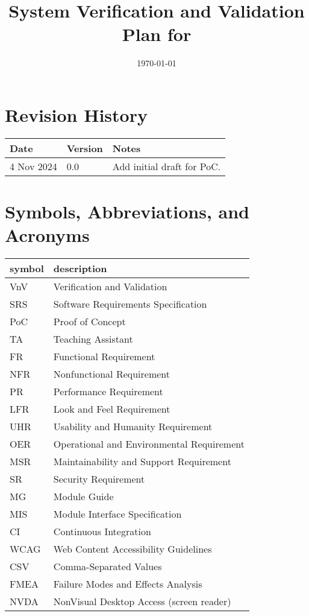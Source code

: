 \documentclass[12pt, titlepage]{article}
\begin{document}
\title{System Verification and Validation Plan for \progname{}} 
\author{\authname}
\date{\today}
	
\maketitle


\section*{Revision History}

\begin{tabularx}{\textwidth}{p{3cm}p{2cm}X} \toprule {\bf Date} & {\bf Version}
& {\bf Notes}\\
\midrule
4 Nov 2024 & 0.0 & Add initial draft for PoC.\\
\bottomrule
\end{tabularx}

\newpage

\tableofcontents

\listoftables

\newpage

\section{Symbols, Abbreviations, and Acronyms}

\renewcommand{\arraystretch}{1.2}\begin{tabular}{l l} 
  \toprule		
  \textbf{symbol} & \textbf{description}\\
  \midrule 
  VnV & Verification and Validation\\
  SRS & Software Requirements Specification\\
  PoC & Proof of Concept\\
  TA & Teaching Assistant\\
  FR & Functional Requirement\\
  NFR & Nonfunctional Requirement\\
  PR & Performance Requirement\\
  LFR & Look and Feel Requirement\\
  UHR & Usability and Humanity Requirement\\
  OER & Operational and Environmental Requirement\\
  MSR & Maintainability and Support Requirement\\
  SR & Security Requirement\\
  MG & Module Guide\\
  MIS & Module Interface Specification\\
  CI & Continuous Integration\\
  WCAG & Web Content Accessibility Guidelines\\
  CSV & Comma-Separated Values\\
  FMEA & Failure Modes and Effects Analysis\\
  NVDA & NonVisual Desktop Access (screen reader)\\
  \bottomrule
\end{tabular}\\
\end{document}
